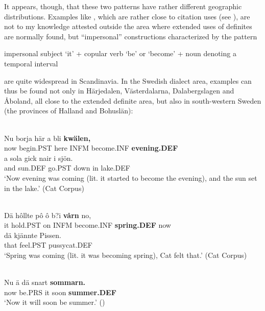 It appears, though, that these two patterns have rather different geographic distributions. Examples like , which are rather close to citation uses (see ), are not to my knowledge attested outside the area where extended uses of definites are normally found, but “impersonal” constructions characterized by the pattern

impersonal subject ‘it’ + copular verb ‘be’ or ‘become’ + noun denoting a temporal interval


are quite widespread in Scandinavia. In the Swedish dialect area, examples can thus be found not only in Härjedalen, Västerdalarna, Dalabergslagen and Åboland, all close to the extended definite area, but also in south-western Sweden (the provinces of Halland and Bohuslän): 

\ea \label{} 
\\
\gll Nu  borja  här  a  bli  \textbf{kwälen,} \\
now  begin.PST  here  INFM  become.INF  \textbf{evening.DEF} \\
\gll a  sola  gick  nair  i  sjön.\\
and  sun.DEF  go.PST  down  in  lake.DEF\\
\glt ‘Now evening was coming (lit. it started to become the evening), and the sun set in the lake.’ (Cat Corpus)

\z

\ea \label{} 
\\
\gll Dä  hôllte  pô  ô  b?i  \textbf{vårn} no,\\
it  hold.PST  on  INFM  become.INF  \textbf{spring.DEF} now\\
\gll dä  kjännte  Pissen.\\
that  feel.PST  pussycat.DEF\\
\glt ‘Spring was coming (lit. it was becoming spring), Cat felt that.’ (Cat Corpus)

\z

\ea \label{} 
\\
\gll Nu  ä  dä  snart  \textbf{sommarn.}\\
now  be.PRS  it  soon  \textbf{summer.DEF}\\
\glt ‘Now it will soon be summer.’ (\citet{Broberg1936})

\z

